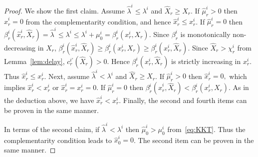 \documentclass[letterpaper, 10 pt, conference]{ieeeconf}  %
\begin{document}
\begin{proof}
We show the first claim.
Assume $\hat{\lambda}^i\leq \lambda^i$ and $\hat{X}_r\geq X_r$.
If $\hat{\mu}^i_r>0$ then $\hat{x}^i_r=0$ from the complementarity condition, and hence $\hat{x}^i_r\leq x^i_r$.
If $\hat{\mu}^i_r=0$ then $\beta^i_r(\hat{x}^i_r,\hat{X}_r)=\hat{\lambda}^i\leq \lambda^i\leq\lambda^i+\mu^i_0=\beta^i_r(x^i_r,X_r)$.
Since $\beta^i_r$ is monotonically non-decreasing in $X_r$, $\beta^i_r(\hat{x}^i_r,\hat{X}_r)\geq \beta^i_r(x^i_r,X_r) \geq \beta^i_r(x^i_r,\hat{X}_r)$.
Since $\hat{X}_r>\chi^i_r$ from Lemma~\ref{lem:delay}, $c^{i \prime}_r(\hat{X}_r)>0$.
Hence $\beta^i_r(x^i_r,\hat{X}_r)$ is strictly increasing in $x^i_r$.
Thus $\hat{x}^i_r\leq x^i_r$.
Next, assume $\hat{\lambda}^i< \lambda^i$ and $\hat{X}_r\geq X_r$.
If $\hat{\mu}^i_r>0$ then $\hat{x}^i_r=0,$ which implies $\hat{x}^i_r<x^i_r$ or $\hat{x}^i_r=x^i_r=0$.
If $\hat{\mu}^i_r=0$ then $\beta^i_r(\hat{x}^i_r,\hat{X}_r)<\beta^i_r(x^i_r,X_r)$.
As in the deduction above, we have $\hat{x}^i_r<x^i_r$.
Finally, the second and fourth items can be proven in the same manner.

In terms of the second claim, if $\hat{\lambda}^i<\lambda^i$ then $\hat{\mu}^i_0>\mu^i_0$ from~\eqref{eq:KKT}.
Thus the complementarity condition leads to $\hat{x}^i_0=0$.
The second item can be proven in the same manner.
\end{proof}
\end{document}
